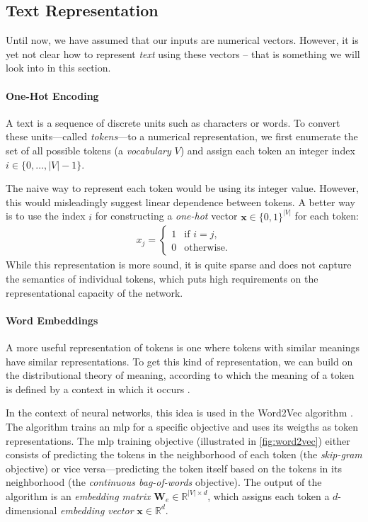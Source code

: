 {\subsection{Text Representation}
\label{sec:text-repr}

Until now, we have assumed that our inputs are numerical vectors. However, it is yet not clear how to represent \emph{text} using these vectors -- that is something we will look into in this section.

\paragraph{One-Hot Encoding}
A text is a sequence of discrete units such as characters or words. To convert these units---called \textit{tokens}---to a numerical representation, we first enumerate the set of all possible tokens (a \textit{vocabulary} $V$) and assign each token an integer index $i \in \{0, \ldots, |V|-1\}$.

The naive way to represent each token would be using its integer value. However, this would misleadingly suggest linear dependence between tokens. A better way is to use the index $i$ for constructing a \textit{one-hot} vector $\mathbf{x} \in \{0,1\}^{|V|} $ for each token:
\begin{align}
    x_j = \begin{cases}
        1 & \text{if } i = j, \\
        0 & \text{otherwise}.
    \end{cases}
\end{align}
While this representation is more sound, it is quite sparse and does not capture the semantics of individual tokens, which puts high requirements on the representational capacity of the network.

\paragraph{Word Embeddings} A more useful representation of tokens is one where tokens with similar meanings have similar representations. To get this kind of representation, we can build on the distributional theory of meaning, according to which the meaning of a token is defined by a context in which it occurs \cite{harris1954distributional,firth1957synopsis}.

In the context of neural networks, this idea is used in the Word2Vec algorithm \cite{mikolov2013distributed}. The algorithm trains an \ac{mlp} for a specific objective and uses its weigths as token representations. The \ac{mlp} training objective (illustrated in \autoref{fig:word2vec}) either consists of predicting the tokens in the neighborhood of each token (the \emph{skip-gram} objective) or vice versa---predicting the token itself based on the tokens in its neighborhood (the \emph{continuous bag-of-words} objective). The output of the algorithm is an \textit{embedding matrix} $\mathbf{W}_e \in \mathbb{R}^{|V|\times d}$, which assigns each token a $d$-dimensional \textit{embedding vector} $\mathbf{x} \in \mathbb{R}^{d}$.

}
